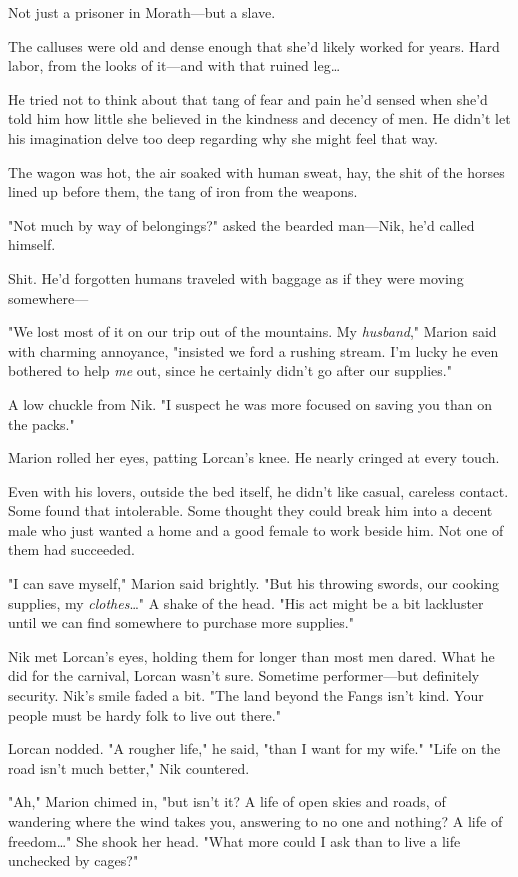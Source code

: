 Not just a prisoner in Morath---but a slave.

The calluses were old and dense enough that she'd likely worked for years.
Hard labor, from the looks of it---and with that ruined leg\ldots{}

He tried not to think about that tang of fear and pain he'd sensed when she'd told him how little she believed in the kindness and decency of men.
He didn't let his imagination delve too deep regarding why she might feel that way.

The wagon was hot, the air soaked with human sweat, hay, the shit of the horses lined up before them, the tang of iron from the weapons.

"Not much by way of belongings?"
asked the bearded man---Nik, he'd called himself.

Shit.
He'd forgotten humans traveled with baggage as if they were moving somewhere---

"We lost most of it on our trip out of the mountains.
My \emph{husband}," Marion said with charming annoyance, "insisted we ford a rushing stream.
I'm lucky he even bothered to help \emph{me} out, since he certainly didn't go after our supplies."

A low chuckle from Nik.
"I suspect he was more focused on saving you than on the packs."

Marion rolled her eyes, patting Lorcan's knee.
He nearly cringed at every touch.

Even with his lovers, outside the bed itself, he didn't like casual, careless contact.
Some found that intolerable.
Some thought they could break him into a decent male who just wanted a home and a good female to work beside him.
Not one of them had succeeded.

"I can save myself," Marion said brightly.
"But his throwing swords, our cooking supplies, my \emph{clothes}\ldots" A shake of the head.
"His act might be a bit lackluster until we can find somewhere to purchase more supplies."

Nik met Lorcan's eyes, holding them for longer than most men dared.
What he did for the carnival, Lorcan wasn't sure.
Sometime performer---but definitely security.
Nik's smile faded a bit.
"The land beyond the Fangs isn't kind.
Your people must be hardy folk to live out there."

Lorcan nodded.
"A rougher life," he said, "than I want for my wife."
"Life on the road isn't much better," Nik countered.

"Ah," Marion chimed in, "but isn't it?
A life of open skies and roads, of wandering where the wind takes you, answering to no one and nothing?
A life of freedom\ldots" She shook her head.
"What more could I ask than to live a life unchecked by cages?"

